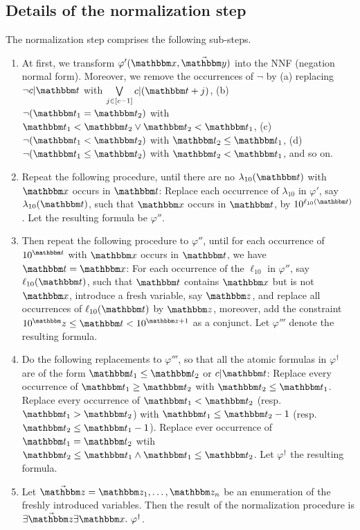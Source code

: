 

\subsection{Details of the normalization step}\label{app-norm}
%
The normalization step comprises the following sub-steps.
\begin{enumerate}
\item At first, we transform $\varphi'(\ivarx,\vec{\ivary})$ into the NNF (negation normal form). Moreover, we remove the occurrences of $\neg$ by (a) replacing $\neg c | \iterm$ with $\bigvee \limits_{j \in [c-1]} c | (\iterm+j)$, (b)  $\neg (\iterm_1 = \iterm_2)$ with $\iterm_1 < \iterm_2 \vee \iterm_2 < \iterm_1$, (c) $\neg (\iterm_1 < \iterm_2)$ with $\iterm_2 \le \iterm_1$, (d) $\neg (\iterm_1 \le \iterm_2)$ with $\iterm_2 < \iterm_1$, and so on.
%
\item Repeat the following procedure, until there are no $\lambda_{10}(\iterm)$ with $\ivarx$ occurs in $\iterm$: Replace each occurrence of $\lambda_{10}$ in $\varphi'$, say $\lambda_{10}(\iterm)$, such that $\ivarx$ occurs in $\iterm$, by $10^{\ell_{10}(\iterm)}$. Let the resulting formula be $\varphi''$.
%
\item Then repeat the following procedure to $\varphi''$, until for each occurrence of $10^{\iterm}$ with $\ivarx$ occurs in $\iterm$, we have $\iterm = \ivarx$: For each occurrence of the $\ell_{10}$ in $\varphi''$, say $\ell_{10}(\iterm)$, such that $\iterm$ contains $\ivarx$ but is not $\ivarx$, introduce a fresh variable, say $\ivarz$, 
and replace all occurrences of $\ell_{10}(\iterm)$ by $\ivarz$, moreover, add the constraint $10^\ivarz \le \iterm < 10^{\ivarz + 1}$ as a conjunct. Let $\varphi'''$ denote the resulting formula.  
%
\item Do the following replacements to $\varphi'''$, so that all the atomic formulas in $\varphi^\dag$ are of the form $\iterm_1 \le \iterm_2$ or $c | \iterm$: Replace every occurrence of $\iterm_1 \ge \iterm_2$ with $\iterm_2 \le \iterm_1$. Replace every occurrence of $\iterm_1 < \iterm_2$ (resp. $\iterm_1 > \iterm_2$) with $\iterm_1 \le \iterm_2 - 1$ (resp. $\iterm_2 \le \iterm_1-1$). Replace ever occurrence of $\iterm_1 = \iterm_2$ wtih $\iterm_2 \le \iterm_1 \wedge \iterm_1 \le \iterm_2$. Let $\varphi^\dag$ the resulting formula. 
%
\item Let $\vec{\ivarz} = \ivarz_1,\ldots, \ivarz_n$ be an enumeration of the freshly introduced variables. Then the result of the normalization procedure is 
$\exists \vec{\ivarz}\exists \ivarx.\ \varphi^\dag$.
\end{enumerate}


